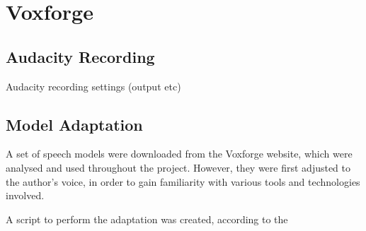 \chapter{Voxforge} %
\label{apdx:voxforge}


\section{Audacity Recording} %
\label{apdx:audacity_recording}
	Audacity recording settings (output etc)


\section{Model Adaptation} %
\label{apdx:model_adaptation}

	A set of speech models were downloaded from the Voxforge website, which were analysed and used throughout the project.  However, they were first adjusted to the author's voice, in order to gain familiarity with various tools and technologies involved.

	A script to perform the adaptation was created, according to the 


